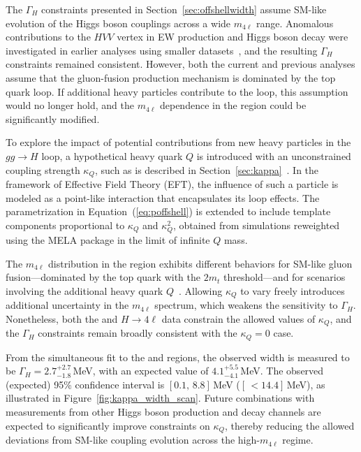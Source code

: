 The $\Gamma_H$ constraints presented in Section~\ref{sec:offshellwidth} assume SM-like evolution of the Higgs boson couplings across a wide $m_{4\ell}$ range. Anomalous contributions to the $HVV$ vertex in EW production and Higgs boson decay were investigated in earlier analyses using smaller datasets~\cite{Sirunyan:2019twz,CMS:2022ley}, and the resulting $\Gamma_H$ constraints remained consistent. However, both the current and previous analyses assume that the gluon-fusion production mechanism is dominated by the top quark loop. If additional heavy particles contribute to the loop, this assumption would no longer hold, and the $m_{4\ell}$ dependence in the \offshell region could be significantly modified.

To explore the impact of potential contributions from new heavy particles in the $gg \to H$ loop, a hypothetical heavy quark $Q$ is introduced with an unconstrained coupling strength $\kappa_Q$, such as is described in Section~\ref{sec:kappa}~\cite{Gritsan:2020pib,Davis:2021tiv}. In the framework of Effective Field Theory (EFT), the influence of such a particle is modeled as a point-like interaction that encapsulates its loop effects. The parametrization in Equation~(\ref{eq:poffshell}) is extended to include template components proportional to $\kappa_Q$ and $\kappa_Q^2$, obtained from simulations reweighted using the MELA package in the limit of infinite $Q$ mass. 

The $m_{4\ell}$ distribution in the \offshell region exhibits different behaviors for SM-like gluon fusion—dominated by the top quark with the $2m_t$ threshold—and for scenarios involving the additional heavy quark $Q$~\cite{Gritsan:2020pib}. Allowing $\kappa_Q$ to vary freely introduces additional uncertainty in the $m_{4\ell}$ spectrum, which weakens the sensitivity to $\Gamma_H$. Nonetheless, both the \onshell and \offshell $H \to 4\ell$ data constrain the allowed values of $\kappa_Q$, and the $\Gamma_H$ constraints remain broadly consistent with the $\kappa_Q = 0$ case.

From the simultaneous fit to the \onshell and \offshell regions, the observed width is measured to be $\Gamma_H = 2.7^{+2.7}_{-1.8}$\,MeV, with an expected value of $4.1^{+5.5}_{-4.1}$\,MeV. The observed (expected) 95\% confidence interval is $[0.1,\,8.8]$\,MeV ($[\,{<}14.4]$\,MeV), as illustrated in Figure~\ref{fig:kappa_width_scan}. Future combinations with measurements from other \onshell Higgs boson production and decay channels are expected to significantly improve constraints on $\kappa_Q$, thereby reducing the allowed deviations from SM-like coupling evolution across the high-$m_{4\ell}$ regime.

